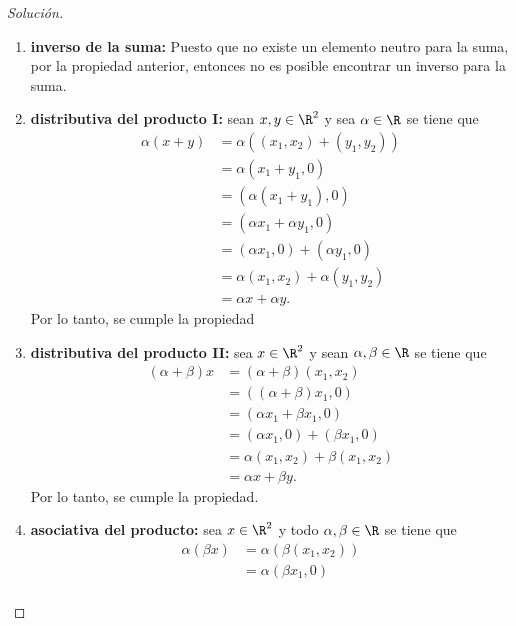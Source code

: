 \documentclass[a4,11pt]{aleph-notas}
\begin{document}
\begin{proof}[Solución]
\begin{enumerate}
    \item \textbf{inverso de la suma:}
        Puesto que no existe un elemento neutro para la suma, por la propiedad anterior, entonces no es posible encontrar un inverso para la suma. 
    \item \textbf{distributiva del producto I:}
        sean $x,y\in \R^2$ y sea $\alpha\in \R$ se tiene que
        \begin{align*}
            \alpha (x+y) & = \alpha ((x_1,x_2)+(y_1,y_2)) \\
            & = \alpha (x_1+y_1,0)\\
            & = (\alpha(x_1+y_1),0) \\
            & = (\alpha x_1 + \alpha y_1,0)\\
            & = (\alpha x_1,0) + (\alpha y_1,0)\\
            & = \alpha(x_1,x_2) + \alpha (y_1,y_2)\\
            & = \alpha x + \alpha y.
        \end{align*}
        Por lo tanto, se cumple la propiedad
    \item \textbf{distributiva del producto II:}
        sea $x\in \R^2$ y sean $\alpha,\beta\in \R$ se tiene que
        \begin{align*}
            (\alpha + \beta) x & = (\alpha + \beta) (x_1,x_2)\\
            & = ((\alpha + \beta) x_1,0)\\
            & = (\alpha x_1 + \beta x_1,0)\\
            & = (\alpha x_1,0) + (\beta x_1,0)\\
            & = \alpha(x_1,x_2) + \beta (x_1,x_2)\\
            & = \alpha x + \beta y.
        \end{align*}
        Por lo tanto, se cumple la propiedad.
    \item \textbf{asociativa del producto:}
        sea $x\in \R^2$ y todo $\alpha,\beta\in \R$ se tiene que
        \begin{align*}
            \alpha (\beta x) & = \alpha (\beta (x_1,x_2)) \\
                & = \alpha (\beta x_1,0)\\

\end{align*}
\end{enumerate}
\end{proof}
\end{document}
